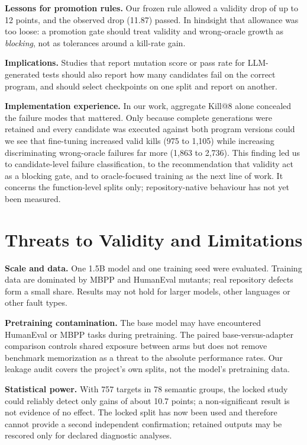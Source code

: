 \documentclass[10pt,conference,letterpaper]{IEEEtran}
\makeatletter
\newcommand{\killk}[1]{Kill@#1}
\makeatother
\begin{document}
\textbf{Lessons for promotion rules.} Our frozen rule allowed a validity drop of up to
12 points, and the observed drop (11.87) passed. In hindsight that allowance was too
loose: a promotion gate should treat validity and wrong-oracle growth as
\emph{blocking}, not as tolerances around a kill-rate gain.

\textbf{Implications.} Studies that report mutation score or pass rate for
LLM-generated tests should also report how many candidates fail on the correct
program, and should select checkpoints on one split and report on another.

\textbf{Implementation experience.} In our work, aggregate \killk{8} alone concealed
the failure modes that mattered. Only because complete generations were retained and
every candidate was executed against both program versions could we see that
fine-tuning increased valid kills (975 to 1,105) while increasing discriminating
wrong-oracle failures far more (1,863 to 2,736). This finding led us to candidate-level
failure classification, to the recommendation that validity act as a blocking gate,
and to oracle-focused training as the next line of work. It concerns the
function-level splits only; repository-native behaviour has not yet been measured.

\section{Threats to Validity and Limitations}
\label{sec:threats}

\textbf{Scale and data.} One 1.5B model and one training seed were evaluated. Training
data are dominated by MBPP and HumanEval mutants; real repository defects form a
small share. Results may not hold for larger models, other languages or other fault
types.

\textbf{Pretraining contamination.} The base model may have encountered HumanEval or
MBPP tasks during pretraining. The paired base-versus-adapter comparison controls
shared exposure between arms but does not remove benchmark memorization as a threat to
the absolute performance rates. Our leakage audit covers the project's own splits, not
the model's pretraining data.

\textbf{Statistical power.} With 757 targets in 78 semantic groups, the locked study
could reliably detect only gains of about 10.7 points; a non-significant result is not
evidence of no effect. The locked split has now been used and therefore cannot provide
a second independent confirmation; retained outputs may be rescored only for declared
diagnostic analyses.
\end{document}
